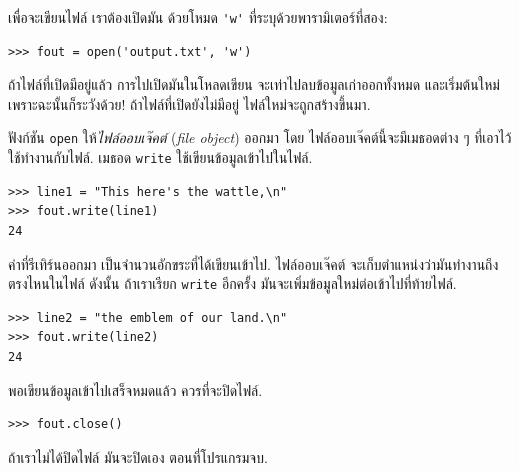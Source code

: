 
เพื่อจะเขียนไฟล์ เราต้องเปิดมัน ด้วยโหมด \verb|'w'| ที่ระบุด้วยพารามิเตอร์ที่สอง:

\begin{verbatim}
>>> fout = open('output.txt', 'w')
\end{verbatim}
%
%
ถ้าไฟล์ที่เปิดมีอยู่แล้ว การไปเปิดมันในโหลดเขียน จะเท่าไปลบข้อมูลเก่าออกทั้งหมด
และเริ่มต้นใหม่ เพราะฉะนั้นก็ระวังด้วย!
ถ้าไฟล์ที่เปิดยังไม่มีอยู่ ไฟล์ใหม่จะถูกสร้างขึ้นมา.



ฟังก์ชัน \texttt{open} ให้\textit{ไฟล์ออบเจ๊คต์} (\textit{file object}) ออกมา
โดย ไฟล์ออบเจ๊คต์นี้จะมีเมธอดต่าง ๆ ที่เอาไว้ใช้ทำงานกับไฟล์.
เมธอด \texttt{write} ใช้เขียนข้อมูลเข้าไปในไฟล์.

\begin{verbatim}
>>> line1 = "This here's the wattle,\n"
>>> fout.write(line1)
24
\end{verbatim}
%
%
ค่าที่รีเทิร์นออกมา เป็นจำนวนอักขระที่ได้เขียนเข้าไป.
ไฟล์ออบเจ๊คต์ จะเก็บตำแหน่งว่ามันทำงานถึงตรงไหนในไฟล์
ดังนั้น ถ้าเราเรียก \texttt{write} อีกครั้ง
มันจะเพิ่มข้อมูลใหม่ต่อเข้าไปที่ท้ายไฟล์.

\begin{verbatim}
>>> line2 = "the emblem of our land.\n"
>>> fout.write(line2)
24
\end{verbatim}
%
%
พอเขียนข้อมูลเข้าไปเสร็จหมดแล้ว ควรที่จะปิดไฟล์.

\begin{verbatim}
>>> fout.close()
\end{verbatim}
%
%
%
ถ้าเราไม่ได้ปิดไฟล์ มันจะปิดเอง ตอนที่โปรแกรมจบ.


